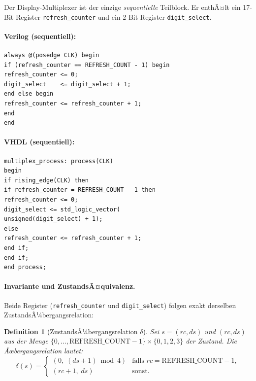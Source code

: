 ﻿\documentclass[12pt,a4paper]{report}
\newtheorem{definition}{Definition}[section]
\begin{document}
Der Display-Multiplexer ist der einzige \emph{sequentielle} Teilblock.  Er
enthÃ¤lt ein 17-Bit-Register \texttt{refresh\_counter} und ein 2-Bit-Register
\texttt{digit\_select}.

\paragraph{Verilog (sequentiell):}
\begin{lstlisting}[style=hdlstyle, caption={Multiplexer in Verilog}]
always @(posedge CLK) begin
if (refresh_counter == REFRESH_COUNT - 1) begin
refresh_counter <= 0;
digit_select    <= digit_select + 1;
end else begin
refresh_counter <= refresh_counter + 1;
end
end
\end{lstlisting}

\paragraph{VHDL (sequentiell):}
\begin{lstlisting}[style=hdlstyle, caption={Multiplexer in VHDL}]
multiplex_process: process(CLK)
begin
if rising_edge(CLK) then
if refresh_counter = REFRESH_COUNT - 1 then
refresh_counter <= 0;
digit_select <= std_logic_vector(
unsigned(digit_select) + 1);
else
refresh_counter <= refresh_counter + 1;
end if;
end if;
end process;
\end{lstlisting}

\paragraph{Invariante und ZustandsÃ¤quivalenz.}

Beide Register (\texttt{refresh\_counter} und \texttt{digit\_\newline select}) folgen
exakt derselben ZustandsÃ¼bergangsrelation:

\begin{definition}[ZustandsÃ¼bergangsrelation $\delta$]
	Sei $s = (\mathit{rc}, \mathit{ds})$ und $(\mathit{rc}, \mathit{ds})$ aus der Menge $\{0,\ldots,\text{REFRESH\_COUNT}-1\} \times \{0,1,2,3\}$ der Zustand.
	Die Ãœbergangsrelation lautet:
	\[
	\delta(s) =
	\begin{cases}
		(0,\; (\mathit{ds} + 1) \bmod 4) & \text{falls } \mathit{rc} = \text{REFRESH\_COUNT} - 1, \\
		(\mathit{rc} + 1,\; \mathit{ds}) & \text{sonst.}
	\end{cases}
	\]
\end{definition}
\end{document}
